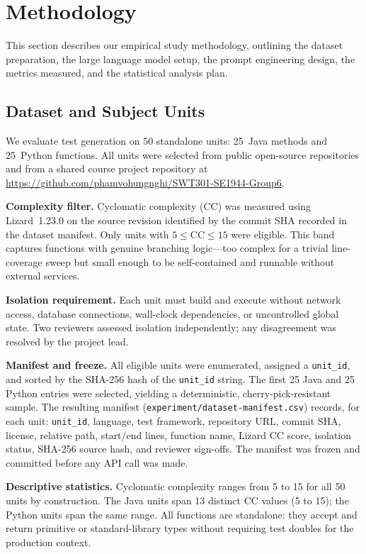 \section{Methodology}
\label{sec:methodology}

This section describes our empirical study methodology, outlining the dataset
preparation, the large language model setup, the prompt engineering design, the
metrics measured, and the statistical analysis plan.

\subsection{Dataset and Subject Units}
\label{subsec:dataset}

We evaluate test generation on 50 standalone units: 25~Java methods and
25~Python functions.
All units were selected from public open-source repositories and from a shared
course project repository at
\url{https://github.com/phamvohungnghi/SWT301-SE1944-Group6}.

\textbf{Complexity filter.}
Cyclomatic complexity (CC) was measured using Lizard~1.23.0 on the source
revision identified by the commit SHA recorded in the dataset manifest.
Only units with $5 \le \text{CC} \le 15$ were eligible.
This band captures functions with genuine branching logic---too complex for a
trivial line-coverage sweep but small enough to be self-contained and runnable
without external services.

\textbf{Isolation requirement.}
Each unit must build and execute without network access, database connections,
wall-clock dependencies, or uncontrolled global state.
Two reviewers assessed isolation independently; any disagreement was resolved by
the project lead.

\textbf{Manifest and freeze.}
All eligible units were enumerated, assigned a \texttt{unit\_id}, and sorted by
the SHA-256 hash of the \texttt{unit\_id} string.
The first 25 Java and 25 Python entries were selected, yielding a deterministic,
cherry-pick-resistant sample.
The resulting manifest (\texttt{experiment/dataset-manifest.csv}) records, for
each unit: \texttt{unit\_id}, language, test framework, repository URL, commit
SHA, license, relative path, start/end lines, function name, Lizard CC score,
isolation status, SHA-256 source hash, and reviewer sign-offs.
The manifest was frozen and committed before any API call was made.

\textbf{Descriptive statistics.}
Cyclomatic complexity ranges from 5 to 15 for all 50 units by construction.
The Java units span 13 distinct CC values (5 to 15); the Python units span the
same range.
All functions are standalone: they accept and return primitive or standard-library
types without requiring test doubles for the production context.

